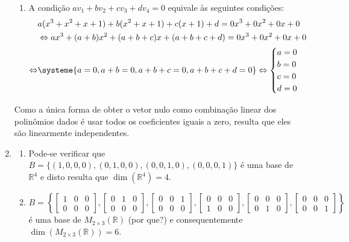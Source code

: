 \documentclass[12pt,a4paper]{article}
\newcommand*\R{\mathbb{R}}
\begin{document}
\begin{enumerate}
\begin{enumerate}
\item A condição $a v_1 + b v_2 + c v_3 + d v_4 = 0$ equivale às seguintes condições:
\begin{align*}
& a ( x^3 + x^2 + x + 1 ) + b ( x^2 + x + 1 ) + c (x + 1) + d
= 0 x^3 + 0 x^2 + 0 x + 0 \\
& \Leftrightarrow
a x^3 + (a+b) x^2 + (a+b+c)x + (a+b+c+d) = 0 x^3 + 0 x^2 + 0 x + 0 \\
\Leftrightarrow
&
\systeme{
a=0,
a+b=0,
a+b+c=0,
a+b+c+d=0
}
\Leftrightarrow
\begin{cases}
a=0\\
b=0\\
c=0\\
d=0
\end{cases}
\end{align*}
\end{enumerate}
Como a única forma de obter o vetor nulo como combinação linear dos polinômios dados é usar todos os coeficientes iguais a zero, resulta que eles são linearmente independentes.


\item
\begin{enumerate}
\item Pode-se verificar que $B = \{ (1,0,0,0), (0,1,0,0), (0,0,1,0), (0,0,0,1) \}$ é uma base de $\R^4$ e disto resulta que $\dim( \R^4 ) = 4$.
\item $B = \left\{
\begin{bmatrix}
1 & 0 & 0 \\0 & 0 & 0
\end{bmatrix},
\begin{bmatrix}
0 & 1 & 0 \\0 & 0 & 0
\end{bmatrix},
\begin{bmatrix}
0 & 0 & 1 \\0 & 0 & 0
\end{bmatrix},
\begin{bmatrix}
0 & 0 & 0 \\1 & 0 & 0
\end{bmatrix},
\begin{bmatrix}
0 & 0 & 0 \\0 & 1 & 0
\end{bmatrix},
\begin{bmatrix}
0 & 0 & 0 \\0 & 0 & 1
\end{bmatrix}
\right\}$ é uma base de $M_{2 \times 3}(\R)$ (por que?) e consequentemente $\dim( M_{2 \times 3}(\R) ) = 6$.


\end{enumerate}
\end{enumerate}
\end{document}
